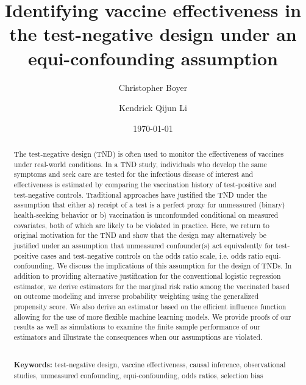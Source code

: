 \documentclass[11pt]{article}
\begin{document}
\begin{titlepage}
\title{Identifying vaccine effectiveness in the test-negative design under an equi-confounding assumption}
\author[1]{Christopher Boyer}%
\author[2]{Kendrick Qijun Li}
\date{\today\vspace{-1em}}
\maketitle

\begin{abstract}
    The test-negative design (TND) is often used to monitor the effectiveness of vaccines under real-world conditions. In a TND study, individuals who develop the same symptoms and seek care are tested for the infectious disease of interest and effectiveness is estimated by comparing the vaccination history of test-positive and test-negative controls. Traditional approaches have justified the TND under the assumption that either a) receipt of a test is a perfect proxy for unmeasured (binary) health-seeking behavior or b) vaccination is unconfounded conditional on measured covariates, both of which are likely to be violated in practice. Here, we return to original motivation for the TND and show that the design may alternatively be justified under an assumption that unmeasured confounder(s) act equivalently for test-positive cases and test-negative controls on the odds ratio scale, i.e. odds ratio equi-confounding. We discuss the implications of this assumption for the design of TNDs. In addition to providing alternative justification for the conventional logistic regression estimator, we derive estimators for the marginal risk ratio among the vaccinated based on outcome modeling and inverse probability weighting using the generalized propensity score. We also derive an estimator based on the efficient influence function allowing for the use of more flexible machine learning models. We provide proofs of our results as well as simulations to examine the finite sample performance of our estimators and illustrate the consequences when our assumptions are violated.
    
\noindent \\
\noindent\textbf{Keywords:} test-negative design, vaccine effectiveness, causal inference, observational studies, unmeasured confounding, equi-confounding, odds ratios, selection bias
\bigskip
\end{abstract}
\setcounter{page}{0}
\thispagestyle{empty}
\end{titlepage}
\pagebreak \newpage
\end{document}

